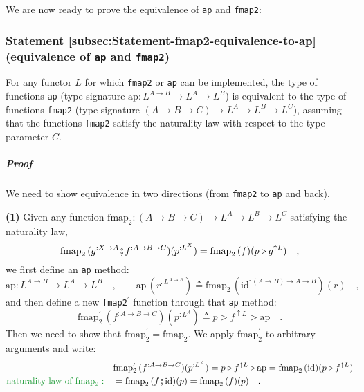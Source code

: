 We are now ready to prove the equivalence of \lstinline!ap! and \lstinline!fmap2!:

\subsubsection{Statement \label{subsec:Statement-fmap2-equivalence-to-ap}\ref{subsec:Statement-fmap2-equivalence-to-ap}
(equivalence of \lstinline!ap! and \lstinline!fmap2!)}

For any functor $L$ for which \lstinline!fmap2! or \lstinline!ap!
can be implemented, the type of functions \lstinline!ap! (type signature
$\text{ap}:L^{A\rightarrow B}\rightarrow L^{A}\rightarrow L^{B}$)
is equivalent to the type of functions \lstinline!fmap2! (type signature
$\left(A\rightarrow B\rightarrow C\right)\rightarrow L^{A}\rightarrow L^{B}\rightarrow L^{C}$),
assuming that the functions \lstinline!fmap2! satisfy the naturality
law with respect to the type parameter $C$.

\subparagraph{Proof}

We need to show equivalence in two directions (from \lstinline!fmap2!
to \lstinline!ap! and back).

\textbf{(1)} Given any function $\text{fmap}_{2}:\left(A\rightarrow B\rightarrow C\right)\rightarrow L^{A}\rightarrow L^{B}\rightarrow L^{C}$
satisfying the naturality law,
\[
\text{fmap}_{2}\,(g^{:X\rightarrow A}\bef f^{:A\rightarrow B\rightarrow C})(p^{:L^{X}})=\text{fmap}_{2}\,(f)(p\triangleright g^{\uparrow L})\quad,
\]
we first define an \lstinline!ap! method:
\[
\text{ap}:L^{A\rightarrow B}\rightarrow L^{A}\rightarrow L^{B}\quad,\quad\quad\text{ap}\,(r^{:L^{A\rightarrow B}})\triangleq\text{fmap}_{2}\,(\text{id}^{:(A\rightarrow B)\rightarrow A\rightarrow B})(r)\quad,
\]
and then define a new \lstinline!fmap2!$^{\prime}$ function through
that \lstinline!ap! method:
\[
\text{fmap}_{2}^{\prime}\,(f^{:A\rightarrow B\rightarrow C})(p^{:L^{A}})\triangleq p\triangleright f^{\uparrow L}\triangleright\text{ap}\quad.
\]
Then we need to show that $\text{fmap}_{2}^{\prime}=\text{fmap}_{2}$.
We apply $\text{fmap}_{2}^{\prime}$ to arbitrary arguments and write:
\begin{align*}
 & \text{fmap}_{2}^{\prime}\,(f^{:A\rightarrow B\rightarrow C})(p^{:L^{A}})=p\triangleright f^{\uparrow L}\triangleright\text{ap}=\text{fmap}_{2}\,(\text{id})(p\triangleright f^{\uparrow L})\\
{\color{greenunder}\text{naturality law of }\text{fmap}_{2}:}\quad & =\text{fmap}_{2}\,(f\bef\text{id})(p)=\text{fmap}_{2}\,(f)(p)\quad.
\end{align*}

